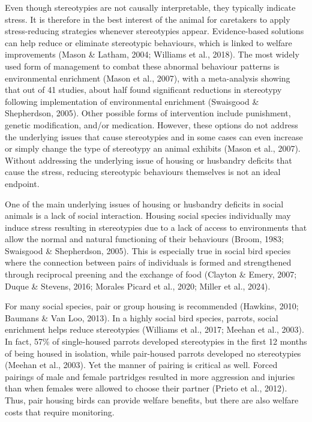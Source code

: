 \documentclass[
  pub]{apa6}
\begin{document}
Even though stereotypies are not causally interpretable, they typically indicate stress. It is therefore in the best interest of the animal for caretakers to apply stress-reducing strategies whenever stereotypies appear. Evidence-based solutions can help reduce or eliminate stereotypic behaviours, which is linked to welfare improvements (Mason \& Latham, 2004; Williams et al., 2018). The most widely used form of management to combat these abnormal behaviour patterns is environmental enrichment (Mason et al., 2007), with a meta-analysis showing that out of 41 studies, about half found
significant reductions in stereotypy following implementation of environmental enrichment (Swaisgood \& Shepherdson, 2005). Other possible forms of intervention include punishment, genetic modification, and/or medication. However, these options do not address the underlying issues that cause stereotypies and in some cases can even increase or simply change the type of stereotypy an animal exhibits (Mason et al., 2007). Without addressing the underlying issue of housing or husbandry deficits that cause the stress, reducing stereotypic behaviours themselves is not an ideal endpoint.

One of the main underlying issues of housing or husbandry deficits in social animals is a lack of social interaction. Housing social species individually may induce stress resulting in stereotypies due to a lack of access to environments that allow the normal and natural functioning of their behaviours (Broom, 1983; Swaisgood \& Shepherdson, 2005). This is especially true in social bird species where the connection between pairs of individuals is formed and strengthened through reciprocal preening and the exchange of food (Clayton \& Emery, 2007; Duque \& Stevens, 2016; Morales Picard et al., 2020; Miller et al., 2024).

For many social species, pair or group housing is recommended (Hawkins, 2010; Baumans \& Van Loo, 2013). In a highly social bird species, parrots, social enrichment helps reduce stereotypies (Williams et al., 2017; Meehan et al., 2003). In fact, 57\% of single-housed parrots developed stereotypies in the first 12 months of being housed in isolation, while pair-housed parrots developed no stereotypies (Meehan et al., 2003). Yet the manner of pairing is critical as well. Forced pairings of male and female partridges resulted in more aggression and injuries than when females were allowed to choose their partner (Prieto et al., 2012). Thus, pair housing birds can provide welfare benefits, but there are also welfare costs that require monitoring.
\end{document}
